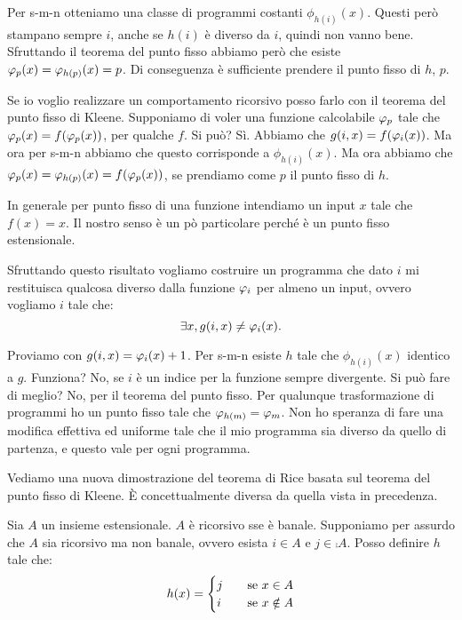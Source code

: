 Per s-m-n otteniamo una classe di programmi costanti $\phi_{h(i)}(x)$. Questi però stampano sempre
$i$, anche se $h(i)$ è diverso da $i$, quindi non vanno bene. Sfruttando il teorema del punto fisso
abbiamo però che esiste $\varphi_{p}(x) = \varphi_{h(p)}(x) = p$. Di conseguenza è sufficiente prendere il
punto fisso di $h$, $p$.

Se io voglio realizzare un comportamento ricorsivo posso farlo con il teorema del punto fisso di
Kleene. Supponiamo di voler una funzione calcolabile $\varphi_{p}$ tale che $\varphi_{p}(x) = f(\varphi_{p}(x))$, per
qualche $f$. Si può? Sì. Abbiamo che $g(i,x) = f(\varphi_{i}(x))$. Ma ora per s-m-n abbiamo che questo
corrisponde a $\phi_{h(i)}(x)$. Ma ora abbiamo che $\varphi_{p}(x) = \varphi_{h(p)}(x) = f(\varphi_{p}(x))$, se
prendiamo come $p$ il punto fisso di $h$.

In generale per punto fisso di una funzione intendiamo un input $x$ tale che $f(x) = x$. Il nostro
senso è un pò particolare perché è un punto fisso estensionale.

Sfruttando questo risultato vogliamo costruire un programma che dato $i$ mi restituisca qualcosa
diverso dalla funzione $\varphi_{i}$ per almeno un input, ovvero vogliamo $i$ tale che:
\begin{equation*}
    \exists x, g(i,x) \not= \varphi_{i}(x).
\end{equation*}

Proviamo con $g(i,x) = \varphi_{i}(x) + 1$. Per s-m-n esiste $h$ tale che $\phi_{h(i)}(x)$ identico a $g$. 
Funziona? No, se $i$ è un indice per la funzione sempre divergente. Si può fare di meglio? No, per
il teorema del punto fisso. Per qualunque trasformazione di programmi ho un punto fisso tale che
$\varphi_{h(m)} = \varphi_{m}$. Non ho speranza di fare una modifica effettiva ed uniforme tale che il mio
programma sia diverso da quello di partenza, e questo vale per ogni programma.

Vediamo una nuova dimostrazione del teorema di Rice basata sul teorema del punto fisso di Kleene. È
concettualmente diversa da quella vista in precedenza.

Sia $A$ un insieme estensionale. $A$ è ricorsivo sse è banale. Supponiamo per assurdo che $A$ sia
ricorsivo ma non banale, ovvero esista $i \in A$ e $j \in \comp{A}$. Posso definire $h$ tale che:
\begin{equation*}
    h(x) = 
    \begin{cases}
        j \quad &\text{se $x \in A$}\\
        i \quad &\text{se $x \notin A$}
    \end{cases}
\end{equation*}

